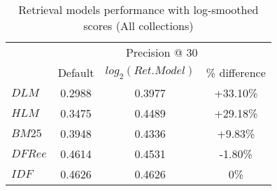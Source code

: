 \begin{table}[]
	
	\caption{Retrieval models performance with log-smoothed scores (All collections)} 
	\centering
	\begin{tabular}{l|c|c|c|} 
		\multicolumn{1}{c}{}&\multicolumn{3}{|c|}{Precision @ 30} \\ 
		\cline{2- 4}
			& Default & $log_2(Ret. Model)$ & \% difference \\
		\hline
					 
		$DLM$ & 0.2988 & 0.3977 & +33.10\% \\
		$HLM$ & 0.3475 & 0.4489 & +29.18\%\\
		$BM25$ & 0.3948 & 0.4336 & +9.83\%\\
		$DFRee$ & 0.4614 & 0.4531 & -1.80\%\\
		$IDF$ & 0.4626 & 0.4626 & 0\%\\
		\hline
	\end{tabular}
	\label{loggedRMS}
\end{table}
